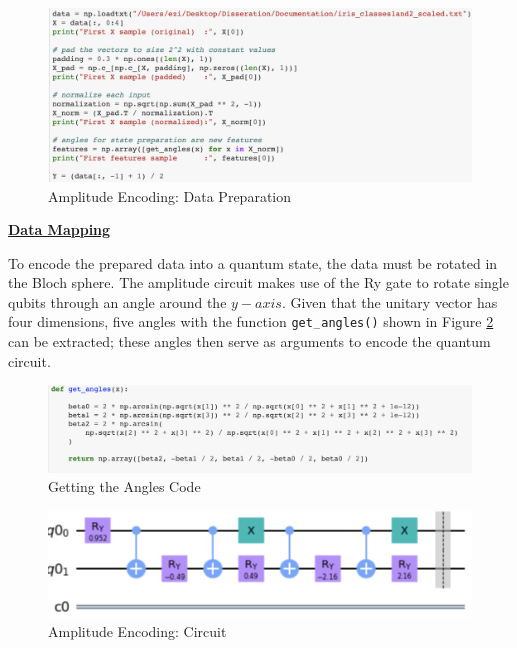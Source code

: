 \begin{figure}[H]
      \centering
      \includegraphics[scale=0.56]{background/AmpDataPrep.png}
      \caption{Amplitude Encoding: Data Preparation }
      \label{AMPDataPrep}
\end{figure}


\vspace{0.3cm}
\textbf{\underline{Data Mapping }}

To encode the prepared data into a quantum state, the data must be rotated in the Bloch sphere. The amplitude circuit makes use of the Ry gate to rotate single qubits through an angle around the $y-axis$. Given that the unitary vector has four dimensions, five angles with the function \texttt{get$_-$angles()} shown in Figure \ref{AMPAng} can be extracted; these angles then serve as arguments to encode the quantum circuit.

\begin{figure}[H]
      \centering
      \includegraphics[scale=0.56]{background/GetAngles.png}
      \caption{Getting the Angles Code }
      \label{AMPAng}
\end{figure}


\begin{figure}[h]
      \centering
      \includegraphics[scale=0.7]{background/RYGate.png}
      \caption{Amplitude Encoding: Circuit }
      \label{AMPCiruit}
\end{figure}



